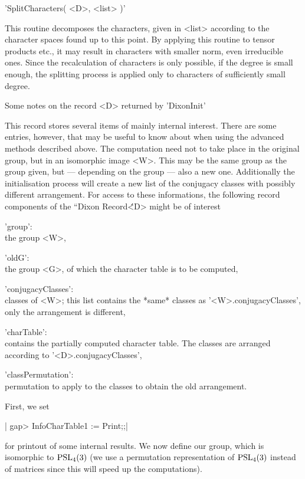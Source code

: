'SplitCharacters( <D>, <list> )'%

This routine decomposes  the characters, given in <list> according to the
character spaces  found up  to this point.  By  applying this routine  to
tensor products etc., it may result in characters with smaller norm, even
irreducible ones. Since the recalculation of characters is only possible,
if the degree is small  enough, the splitting process is applied  only to
characters of sufficiently small degree.

Some notes on the record <D> returned by 'DixonInit'{\:}

This record stores several items of mainly  internal interest.  There are
some entries, however, that may be  useful  to  know about when using the
advanced  methods described above. The computation need not to take place
in the original group,  but in an isomorphic image  <W>.  This may be the
same group as the group  given, but --- depending on the group --- also a
new  one.  Additionally the initialisation process will create a new list
of the conjugacy classes with possibly different arrangement.  For access
to  these informations, the following record components  of  the  ``Dixon
Record\'\' <D> might be of interest\:

'group':\\
    the group <W>,

'oldG':\\
    the group <G>, of which the character table is to be computed,

'conjugacyClasses':\\
    classes   of  <W>;  this  list  contains   the  *same*   classes   as
    '<W>.conjugacyClasses', only the arrangement is different,

'charTable':\\
    contains  the partially computed character table.   The  classes  are
    arranged according to '<D>.conjugacyClasses',

'classPermutation':\\
    permutation to apply to the classes to obtain the old arrangement.



First, we set

|    gap> InfoCharTable1 := Print;;|

for  printout of some internal results. We now define our group, which is
isomorphic  to ${\rm PSL}_4(3)$  (we use  a permutation representation of
${\rm  PSL}_4(3)$  instead  of matrices  since  this will  speed  up  the
computations).

